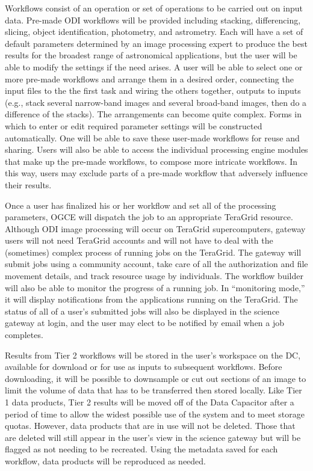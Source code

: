 \documentclass[10pt,conference]{IEEEtran}
\begin{document}
Workflows consist of an operation or set of operations to be carried out on input data. Pre-made ODI workflows will be provided including stacking, differencing, slicing, object identification, photometry, and astrometry. Each will have a set of default parameters determined by an image processing expert to produce the best results for the broadest range of astronomical applications, but the user will be able to modify the settings if the need arises. A user will be able to select one or more pre-made workflows and arrange them in a desired order, connecting the input files to the the first task and wiring the others together, outputs to inputs (e.g., stack several narrow-band images and several broad-band images, then do a difference of the stacks). The arrangements can become quite complex. Forms in which to enter or edit required parameter settings will be constructed automatically. One will be able to save these user-made workflows for reuse and sharing.  Users will also be able to access the individual processing engine modules that make up the pre-made workflows, to compose more intricate workflows. In this way, users may exclude parts of a pre-made workflow that adversely influence their results.

Once a user has finalized his or her workflow and set all of the processing parameters, OGCE will dispatch the job to an appropriate TeraGrid resource. Although ODI image processing will occur on TeraGrid supercomputers, gateway users will not need TeraGrid accounts and will not have to deal with the (sometimes) complex process of running jobs on the TeraGrid. The gateway will submit jobs using a community account, take care of all the authorization and file movement details, and track resource usage by individuals. The workflow builder will also be able to monitor the progress of a running job. In ``monitoring mode,'' it will display notifications from the applications running on the TeraGrid. The status of all of a user's submitted jobs will also be displayed in the science gateway at login, and the user may elect to be notified by email when a job completes. 
 
Results from Tier 2 workflows will be stored in the user's workspace on the DC, available for download or for use as inputs to subsequent workflows. Before downloading, it will be possible to downsample or cut out sections of an image to limit the volume of data that has to be transferred then stored locally. Like Tier 1 data products, Tier 2 results will be moved off of the Data Capacitor after a period of time to allow the widest possible use of the system and to meet storage quotas. However, data products that are in use will not be deleted. Those that are deleted will still appear in the user's view in the science gateway but will be flagged as not needing to be recreated. Using the metadata saved for each workflow, data products will be reproduced as needed.
\end{document}
